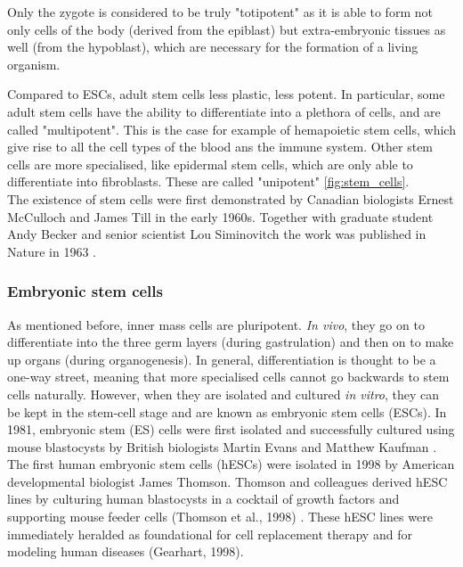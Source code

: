 Only the zygote is considered to be truly "totipotent" as it is able to form not only cells of the body (derived from the epiblast) but extra-embryonic tissues as well (from the hypoblast), which are necessary for the formation of a living organism.

Compared to ESCs, adult stem cells less plastic, less potent.
In particular, some adult stem cells have the ability to differentiate into a plethora of cells, and are called "multipotent".
This is the case for example of hemapoietic stem cells, which give rise to all the cell types of the blood ans the immune system.
Other stem cells are more specialised, like epidermal stem cells, which are only able to differentiate into fibroblasts.
These are called "unipotent" \ref{fig:stem_cells}.\\

The existence of stem cells were first demonstrated by Canadian biologists Ernest McCulloch and James Till in the early 1960s.
Together with graduate student Andy Becker and senior scientist Lou Siminovitch the work was published in Nature in 1963 \cite{becker1963cytological}.


\subsubsection{Embryonic stem cells}

As mentioned before, inner mass cells are pluripotent.
\textit{In vivo}, they go on to differentiate into the three germ layers (during gastrulation) and then on to make up organs (during organogenesis).
In general, differentiation is thought to be a one-way street, meaning that more specialised cells cannot go backwards to stem cells naturally.
However, when they are isolated and cultured \textit{in vitro}, they can be kept in the stem-cell stage and are known as embryonic stem cells (ESCs).
In 1981, embryonic stem (ES) cells were first isolated and successfully cultured using mouse blastocysts by British biologists Martin Evans and Matthew Kaufman \cite{evans1981establishment, martin1981isolation}.
The first human embryonic stem cells (hESCs) were isolated in 1998 by American developmental biologist James Thomson.
Thomson and colleagues derived hESC lines by culturing human blastocysts in a cocktail of growth factors and supporting mouse feeder cells (Thomson et al., 1998) \cite{thomson1998embryonic}. 
These hESC lines were immediately heralded as foundational for cell replacement therapy and for modeling human diseases (Gearhart, 1998).
\cite{saha2009technical}

